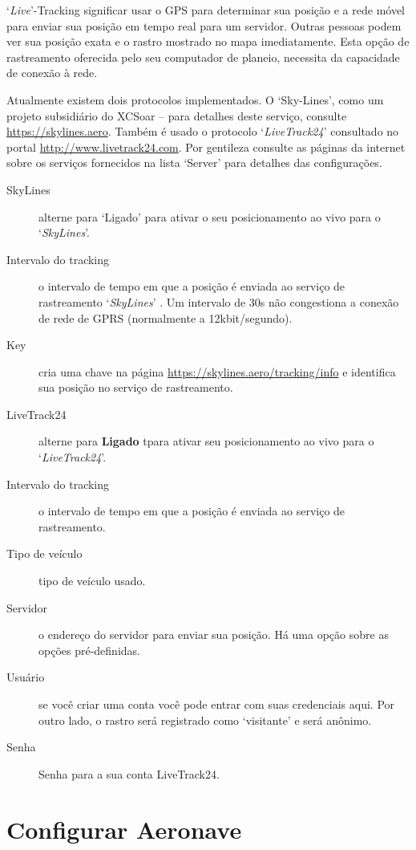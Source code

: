 `{\it Live}'-Tracking significar usar o GPS para determinar sua posição e a rede móvel para enviar sua posição em tempo real para um servidor.  Outras pessoas podem ver sua posição exata e o rastro mostrado no mapa imediatamente.  Esta opção de rastreamento oferecida pelo seu computador de planeio, necessita da capacidade de conexão à rede.  

Atualmente existem dois protocolos implementados. O ‘Sky-Lines’, como um projeto subsidiário do XCSoar – para detalhes deste serviço, consulte
\url{https://skylines.aero}. 
Também é usado o protocolo  `{\em LiveTrack24}' consultado no portal  \url{http://www.livetrack24.com}.  
Por gentileza consulte as páginas da internet sobre os serviços fornecidos na lista ‘Server’ para detalhes das configurações.

\begin{description}
\item[SkyLines]  alterne para ‘Ligado’ para ativar o seu posicionamento ao vivo para o `{\em SkyLines}'.
\item[Intervalo do tracking]  o intervalo de tempo em que a posição é enviada ao serviço de rastreamento  `{\em SkyLines}' .  Um intervalo de 30s não congestiona a conexão de rede de GPRS (normalmente a 12kbit/segundo).
\item[Key]  cria uma chave na página  \url{https://skylines.aero/tracking/info} 
   e identifica sua posição no serviço de rastreamento.
\\
\item[LiveTrack24]  alterne para  {\bf Ligado} tpara ativar seu posicionamento ao vivo para o `{\em LiveTrack24}'.
\item[Intervalo do tracking]  o intervalo de tempo em que a posição é enviada ao serviço de rastreamento.
\item[Tipo de veículo] tipo de veículo usado.
\item[Servidor]  o endereço do servidor para enviar sua posição.  Há uma opção sobre as opções pré-definidas.
\item[Usuário]  se você criar uma conta você pode entrar com suas credenciais aqui.  Por outro lado, o rastro será registrado como ‘visitante’ e será anônimo.
\item[Senha]  Senha para a sua conta LiveTrack24.
\end{description}


\section{Configurar Aeronave}

